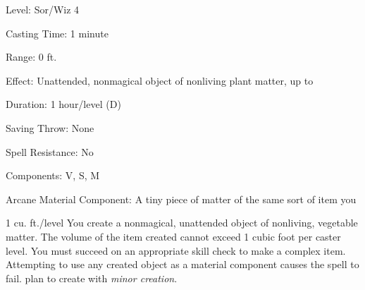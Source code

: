 
\begin{description*}
\item[Level:] Sor/Wiz 4
\item[Casting Time:] 1 minute
\item[Range:] 0 ft.
\item[Effect:] Unattended, nonmagical object of nonliving plant matter, up to
\item[Duration:] 1 hour/level (D)
\item[Saving Throw:] None
\item[Spell Resistance:] No
\item[Components:] V, S, M
\item[Arcane Material Component:] A tiny piece of matter of the same sort of item you
\end{description*}

1 cu. ft./level
You create a nonmagical, unattended object of nonliving, vegetable matter. The
volume of the item created cannot exceed 1 cubic foot per caster level. You must
succeed on an appropriate skill check to make a complex item.
Attempting to use any created object as a material component causes the spell to
fail.
plan to create with \textit{minor creation}.